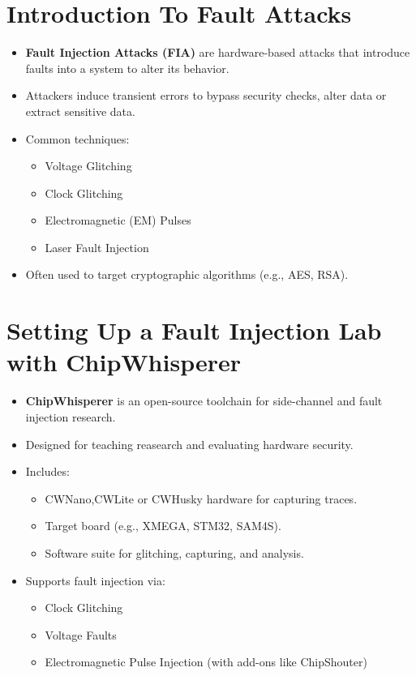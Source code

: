 \documentclass{beamer}
\newenvironment{tres important}[2][]{
	\setkeys{EmphEqEnv}{#2}
	\setkeys{EmphEqOpt}{box={\setlength{\fboxsep}{10pt}\fcolorbox{myNewColorA}{white}},#1}
	\EmphEqMainEnv}
{\endEmphEqMainEnv}
\begin{document}
\section{Introduction To Fault Attacks}
\begin{frame}

  \begin{itemize}
    \item \textbf{Fault Injection Attacks (FIA)} are hardware-based attacks that introduce faults into a system to alter its behavior.
    \item Attackers induce transient errors to bypass security checks, alter data or extract sensitive data.
    \item Common techniques:
    \begin{itemize}
        \item Voltage Glitching
        \item Clock Glitching
        \item Electromagnetic (EM) Pulses
        \item Laser Fault Injection
    \end{itemize}
    \item Often used to target cryptographic algorithms (e.g., AES, RSA).
  \end{itemize}
\end{frame}


\section{Setting Up a Fault Injection Lab with ChipWhisperer}

\begin{frame}

  \begin{itemize}
    \item \textbf{ChipWhisperer} is an open-source toolchain for side-channel and fault injection research.
    \item Designed for teaching reasearch and evaluating hardware security.
    \item Includes:
    \begin{itemize}
        \item CWNano,CWLite or CWHusky hardware for capturing traces.
        \item Target board (e.g., XMEGA, STM32, SAM4S).
        \item Software suite for glitching, capturing, and analysis.
    \end{itemize}
    \item Supports fault injection via:
    \begin{itemize}
        \item Clock Glitching
        \item Voltage Faults
        \item Electromagnetic Pulse Injection (with add-ons like ChipShouter)
    \end{itemize}
  \end{itemize}
\end{frame}
\end{document}
